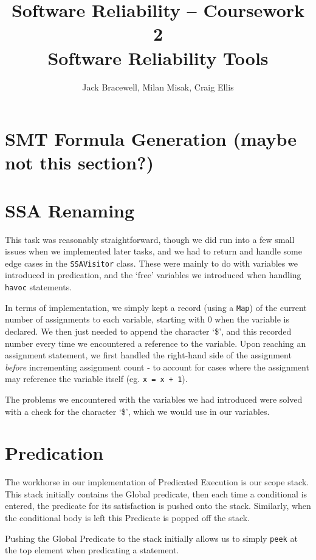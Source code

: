 \documentclass[11pt]{article}
\title{Software Reliability -- Coursework 2 \\ Software Reliability Tools}
\author{Jack Bracewell, Milan Misak, Craig Ellis}
\date{}
\begin{document}
\maketitle

\section{SMT Formula Generation (maybe not this section?)}

\section{SSA Renaming}

This task was reasonably straightforward, though we did run into a few small issues when we implemented later tasks, and we had to return and handle some edge cases in the \verb|SSAVisitor| class. These were mainly to do with variables we introduced in predication, and the `free' variables we introduced when handling \verb|havoc| statements.

In terms of implementation, we simply kept a record (using a \verb|Map|) of the current number of assignments to each variable, starting with 0 when the variable is declared. We then just needed to append the character `\$', and this recorded number every time we encountered a reference to the variable. Upon reaching an assignment statement, we first handled the right-hand side of the assignment \emph{before} incrementing assignment count - to account for cases where the assignment may reference the variable itself (eg. \verb|x = x + 1|).

The problems we encountered with the variables we had introduced were solved with a check for the character `\$', which we would use in our variables.

\section{Predication}

The workhorse in our implementation of Predicated Execution is our scope stack. This stack initially contains the Global predicate, then each time a conditional is entered, the predicate for its satisfaction is pushed onto the stack. Similarly, when the conditional body is left this Predicate is popped off the stack.

Pushing the Global Predicate to the stack initially allows us to simply \verb|peek| at the top element when predicating a statement.
\end{document}
